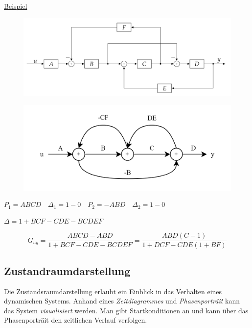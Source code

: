 \documentclass[
  10pt,
  a4paper,
  twocolumn]{article}
\numberwithin{equation}{section}
\begin{document}
\ul{Beispiel}

\begin{figure}[H]

{\centering \includegraphics{images/paste-65.png}

}

\end{figure}

\begin{figure}[H]

{\centering \includegraphics{images/paste-66.png}

}

\end{figure}

\(P_1 = ABCD \quad \Delta_1 = 1-0\quad P_2 = -ABD \quad \Delta_2=1-0\)

\(\Delta=1+BCF-CDE-BCDEF\)

\small

\[
G_{uy}=\frac{ABCD-ABD}{1+BCF-CDE-BCDEF}=\frac{ABD(C-1)}{1+DCF-CDE(1+BF)}
\]

\normalsize

\hypertarget{zustandraumdarstellung}{%
\subsection{Zustandraumdarstellung}\label{zustandraumdarstellung}}

Die Zustandsraumdarstellung erlaubt ein Einblick in das Verhalten eines
dynamischen Systems. Anhand eines \emph{Zeitdiagrammes} und
\emph{Phasenporträit} kann das System \emph{visualisiert} werden. Man
gibt Startkonditionen an und kann über das Phasenporträit den zeitlichen
Verlauf verfolgen.
\end{document}
